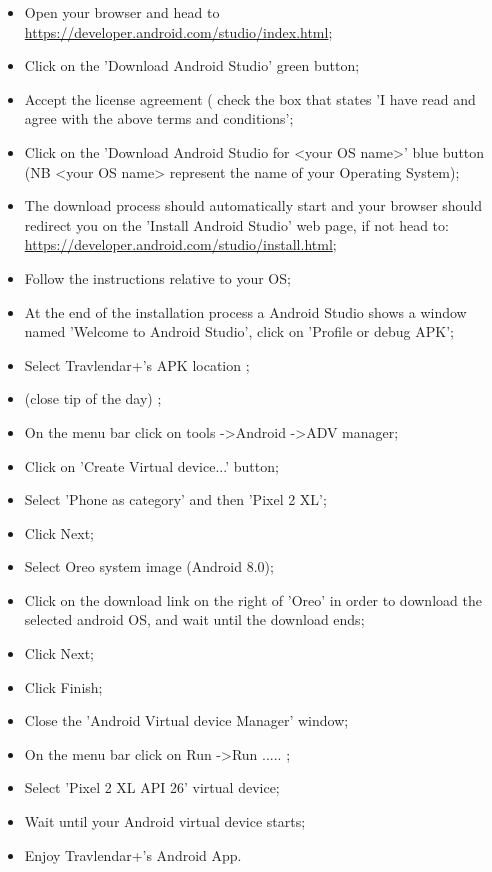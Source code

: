 \begin{itemize}
	\item Open your browser and head to \href{https://developer.android.com/studio/index.html}{\color{blue}https://developer.android.com/studio/index.html};
	\item Click on the 'Download Android Studio' green button;
	\item Accept the license agreement ( check the box that states 'I have read and agree with the above terms and conditions';
	\item Click on the 'Download Android Studio for <your OS name>' blue button (NB <your OS name> represent the name of your Operating System);
	\item The download process should automatically start and your browser should redirect you on the 'Install Android Studio' web page, if not head to: \href{https://developer.android.com/studio/install.html}{\color{blue}https://developer.android.com/studio/install.html};
	\item Follow the instructions relative to your OS;
	\item At the end of the installation process a Android Studio shows a window named 'Welcome to Android Studio', click on 'Profile or debug APK';
	\item Select Travlendar+'s APK location ;
	\item (close tip of the day) ;
	\item On the menu bar click on tools -\textgreater Android -\textgreater ADV manager;
	\item Click on 'Create Virtual device...' button;
	\item Select 'Phone as category' and then 'Pixel 2 XL';
	\item Click Next;
	\item Select Oreo system image (Android 8.0);
	\item Click on the download link on the right of 'Oreo' in order to download the selected android OS, and wait until the download ends; 
	\item Click Next;
	\item Click Finish;
	\item Close the 'Android Virtual device Manager' window;
	\item On the menu bar click on Run -\textgreater Run ..... ;
	\item Select 'Pixel 2 XL API 26' virtual device;
	\item Wait until your Android virtual device starts;
	\item Enjoy Travlendar+'s Android App.	
\end{itemize}